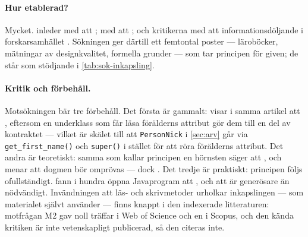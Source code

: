 \paragraph{Hur etablerad?}  Mycket.  \Textcite{Sullivan2001Modularity}
inleder med att ; \textcite{Tempero2009Fields} med att
; och kritikerna
\textcite{Ostermann2011Revisiting} med att informationsdöljande i
forskarsamhället .  Sökningen ger därtill ett
femtontal poster --- läroböcker, mätningar av designkvalitet, formella
grunder --- som tar principen för given; de står som stödjande i
\cref{tab:sok-inkapsling}.

\paragraph{Kritik och förbehåll.}  Motsökningen bär tre förbehåll.  Det
första är gammalt: \textcite{Snyder1986} visar i samma artikel att
, eftersom
en underklass som får läsa förälderns attribut gör dem till en del av
kontraktet --- vilket är skälet till att \texttt{PersonNick}
i \cref{sec:arv} går via \texttt{get_first_name()} och
\texttt{super()} i stället för att röra förälderns attribut.
Det andra är teoretiskt: samma \textcite{Sullivan2001Modularity} som
kallar principen en hörnsten säger att
, och
\textcite{Ostermann2011Revisiting} menar att dogmen bör omprövas ---
dock .  Det tredje är
praktiskt: principen följs ofullständigt.  \Textcite{Tempero2009Fields}
fann i hundra öppna Javaprogram att
, och
\textcite{ZollerSchmolitzky2012} att
 är generösare än nödvändigt.  Invändningen att
läs- och skrivmetoder urholkar inkapslingen --- som materialet självt
använder --- finns knappt i den indexerade litteraturen: motfrågan M2 gav
noll träffar i Web of Science och en i Scopus, och den kända kritiken är
inte vetenskapligt publicerad, så den citeras inte.

